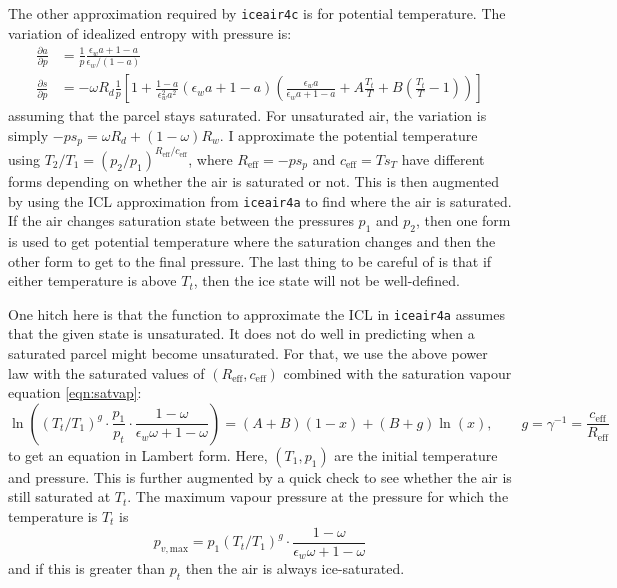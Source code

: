 \documentclass{article}
\newcommand{\eff}{\text{eff}}
\newcommand{\epsw}{\epsilon_w}
\begin{document}
The other approximation required by \texttt{iceair4c} is for potential temperature. The variation of idealized entropy with pressure is:
\begin{align*}
    \frac{\partial a}{\partial p} &= \frac{1}{p} \frac{\epsw a + 1-a}{\epsw/(1-a)} \\
    \frac{\partial s}{\partial p} &= -\omega R_d \frac{1}{p} \left[ 1 + \frac{1-a}{\epsw^2 a^2} (\epsw a + 1-a) \left( \frac{\epsw a}{\epsw a + 1-a} + A \frac{T_t}{T} + B \left( \frac{T_t}{T} - 1 \right) \right) \right]
\end{align*}
assuming that the parcel stays saturated. For unsaturated air, the variation is simply $-p s_p = \omega R_d + (1-\omega) R_w$. I approximate the potential temperature using $T_2/T_1 = (p_2/p_1)^{R_{\eff}/c_{\eff}}$, where $R_{\eff} = -p s_p$ and $c_{\eff} = T s_T$ have different forms depending on whether the air is saturated or not. This is then augmented by using the ICL approximation from \texttt{iceair4a} to find where the air is saturated. If the air changes saturation state between the pressures $p_1$ and $p_2$, then one form is used to get potential temperature where the saturation changes and then the other form to get to the final pressure. The last thing to be careful of is that if either temperature is above $T_t$, then the ice state will not be well-defined.

One hitch here is that the function to approximate the ICL in \texttt{iceair4a} assumes that the given state is unsaturated. It does not do well in predicting when a saturated parcel might become unsaturated. For that, we use the above power law with the saturated values of $(R_{\eff}, c_{\eff})$ combined with the saturation vapour equation \ref{eqn:satvap}:
\begin{equation*}
    \ln\left( (T_t/T_1)^g \cdot \frac{p_1}{p_t} \cdot \frac{1-\omega}{\epsw \omega + 1-\omega} \right) = (A+B) (1 - x) + (B+g) \ln(x), \qquad g = \gamma^{-1} = \frac{c_{\eff}}{R_{\eff}}
\end{equation*}
to get an equation in Lambert form. Here, $(T_1,p_1)$ are the initial temperature and pressure. This is further augmented by a quick check to see whether the air is still saturated at $T_t$. The maximum vapour pressure at the pressure for which the temperature is $T_t$ is
\begin{equation*}
    p_{v,\text{max}} = p_1 (T_t/T_1)^g \cdot \frac{1-\omega}{\epsw \omega + 1-\omega}
\end{equation*}
and if this is greater than $p_t$ then the air is always ice-saturated.
\end{document}

